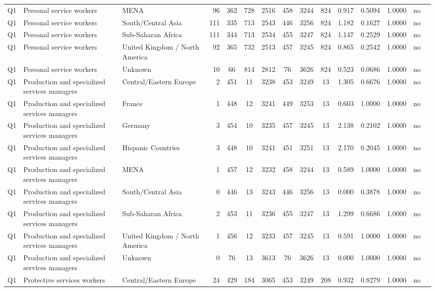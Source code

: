 \begin{longtable}{lllrcccccccccll}
Q1 & Personal service workers & MENA & 96 & 362 & 728 & 2516 & 458 & 3244 & 824 & 0.917 & 0.5094 & 1.0000 & no \\
Q1 & Personal service workers & South/Central Asia & 111 & 335 & 713 & 2543 & 446 & 3256 & 824 & 1.182 & 0.1627 & 1.0000 & no \\
Q1 & Personal service workers & Sub-Saharan Africa & 111 & 344 & 713 & 2534 & 455 & 3247 & 824 & 1.147 & 0.2529 & 1.0000 & no \\
Q1 & Personal service workers & United Kingdom / North America & 92 & 365 & 732 & 2513 & 457 & 3245 & 824 & 0.865 & 0.2542 & 1.0000 & no \\
Q1 & Personal service workers & Unknown & 10 & 66 & 814 & 2812 & 76 & 3626 & 824 & 0.523 & 0.0686 & 1.0000 & no \\
Q1 & Production and specialized services managers & Central/Eastern Europe & 2 & 451 & 11 & 3238 & 453 & 3249 & 13 & 1.305 & 0.6676 & 1.0000 & no \\
Q1 & Production and specialized services managers & France & 1 & 448 & 12 & 3241 & 449 & 3253 & 13 & 0.603 & 1.0000 & 1.0000 & no \\
Q1 & Production and specialized services managers & Germany & 3 & 454 & 10 & 3235 & 457 & 3245 & 13 & 2.138 & 0.2102 & 1.0000 & no \\
Q1 & Production and specialized services managers & Hispanic Countries & 3 & 448 & 10 & 3241 & 451 & 3251 & 13 & 2.170 & 0.2045 & 1.0000 & no \\
Q1 & Production and specialized services managers & MENA & 1 & 457 & 12 & 3232 & 458 & 3244 & 13 & 0.589 & 1.0000 & 1.0000 & no \\
Q1 & Production and specialized services managers & South/Central Asia & 0 & 446 & 13 & 3243 & 446 & 3256 & 13 & 0.000 & 0.3878 & 1.0000 & no \\
Q1 & Production and specialized services managers & Sub-Saharan Africa & 2 & 453 & 11 & 3236 & 455 & 3247 & 13 & 1.299 & 0.6686 & 1.0000 & no \\
Q1 & Production and specialized services managers & United Kingdom / North America & 1 & 456 & 12 & 3233 & 457 & 3245 & 13 & 0.591 & 1.0000 & 1.0000 & no \\
Q1 & Production and specialized services managers & Unknown & 0 & 76 & 13 & 3613 & 76 & 3626 & 13 & 0.000 & 1.0000 & 1.0000 & no \\
Q1 & Protective services workers & Central/Eastern Europe & 24 & 429 & 184 & 3065 & 453 & 3249 & 208 & 0.932 & 0.8279 & 1.0000 & no \\

\end{longtable}
